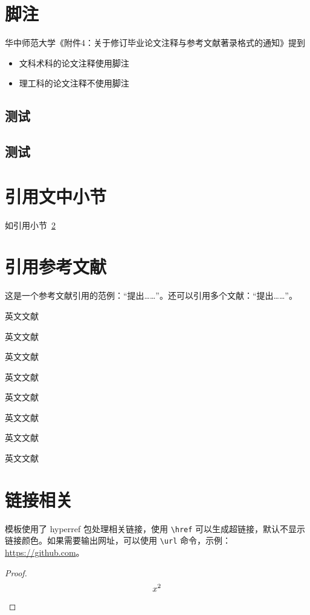 \section{脚注}
华中师范大学《附件4：关于修订毕业论文注释与参考文献著录格式的通知》提到

\begin{itemize}
  \item 文科术科的论文注释使用脚注
  \item 理工科的论文注释不使用脚注
\end{itemize}

\subsection{测试}
\subsection{测试}

\section{引用文中小节}\label{sec:ref}

如引用小节~\ref{sec:ref}

\section{引用参考文献}

这是一个参考文献引用的范例：“\parencite{邱泽奇建构与分化}提出……”。还可以引用多个文献：“\parencite{丁文祥rawtype,李晓东rawtype}提出……”。

英文文献 \parencite{feynman2011}

英文文献 \parencite[12]{feynman2011}

英文文献 \parencite[Thm1]{feynman2011}

英文文献 \parencite[12][Thm1]{feynman2011}

英文文献 \cite{feynman2011}

英文文献 \cite[12]{feynman2011}

英文文献 \cite[Thm1]{feynman2011}

英文文献 \cite[12][Thm1]{feynman2011}

\section{链接相关}

模板使用了 hyperref 包处理相关链接，使用 \verb|\href| 可以生成超链接，默认不显示链接颜色。如果需要输出网址，可以使用 \verb|\url| 命令，示例：\url{https://github.com}。
\begin{proof}
  \[
    x^2  \qedhere
  \]
\end{proof}

\fi